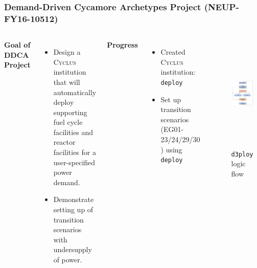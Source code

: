 \begin{frame}
    \frametitle{Demand-Driven Cycamore Archetypes Project (NEUP-FY16-10512) }
          \begin{columns}
                  \column[t]{5cm}
                  \textbf{Goal of DDCA Project}
                  \\
                  \vspace{0.1cm} 
                  \begin{itemize}
                      \item Design a \textsc{Cyclus} institution 
                      that will
                      automatically deploy supporting fuel 
                      cycle facilities and reactor 
                      facilities for a user-specified 
                      power demand.
                      \item Demonstrate setting up of 
                      transition scenarios 
                      with undersupply of power. 
                  \end{itemize}
                  \textbf{Progress}
                  \vspace{0.1cm} 
                  \begin{itemize}
                    \item Created \textsc{Cyclus} institution: 
                    \texttt{deploy}
                    \item Set up transition scenarios 
                    (EG01-23/24/29/30 \cite{wigeland_nuclear_2014}) 
                    using \texttt{deploy}
                  \end{itemize}
                  \column[t]{5cm}
          \begin{figure}[htbp!]
          \begin{center}
        \includegraphics[height=5.5cm]{./images/d3ploy-flow}
      \end{center}
            \caption{\texttt{d3ploy} logic flow \cite{chee_demonstration_2019}}
      \label{fig:d3ploy-flow}
    \end{figure}
          \end{columns}
  \end{frame}
